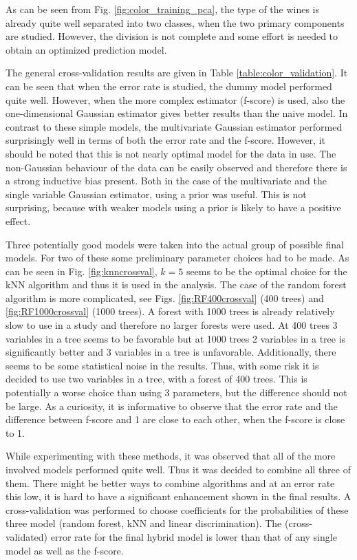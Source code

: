 \documentclass[twoside]{article}
\begin{document}
\begin{multicols}{2}
As can be seen from Fig. \ref{fig:color_training_pca}, the type of the wines is already quite well separated into two 
classes, when the two primary components are studied. However, the division is not complete and some effort is needed
to obtain an optimized prediction model. 

The general cross-validation results are given in Table \ref{table:color_validation}. It can be seen that when the error
rate is studied, the dummy model performed quite well. However, when the more complex estimator (f-score) is used,
also the one-dimensional Gaussian estimator gives better results than the naive model. In contrast to these simple models,
the multivariate Gaussian estimator performed surprisingly well in terms of both the error rate and the f-score.
However, it should be noted that this is not nearly optimal model for the data in use. The non-Gaussian behaviour
of the data can be easily observed and therefore there is a strong inductive bias present. Both in the case of the
multivariate and the single variable Gaussian estimator, using a prior was useful. This is not surprising, because
with weaker models using a prior is likely to have a positive effect.

Three potentially good models were taken into the actual group of possible final models. For two of these some preliminary
parameter choices had to be made. As can be seen in Fig. \ref{fig:knncrossval}, $k = 5$ seems to be the optimal choice
for the kNN algorithm and thus it is used in the analysis. The case of the random forest algorithm is more complicated, see
Figs. \ref{fig:RF400crossval} (400 trees) and \ref{fig:RF1000crossval} (1000 trees).
A forest with 1000 trees is already relatively slow to use in a study and therefore no larger forests were used. At 400
trees 3 variables in a tree seems to be favorable but at 1000 trees 2 variables in a tree is significantly better and 3 variables
in a tree is unfavorable. Additionally, there seems to be some statistical noise in the results. Thus, with some risk it is
decided to use two variables in a tree, with a forest of 400 trees. This is potentially a worse choice than using 3 parameters,
but the difference should not be large. As a curiosity, it is informative to observe that the error rate and the difference between
f-score and 1 are close to each other, when the f-score is close to 1.

While experimenting with these methods, it was observed that all of the more involved models performed quite well. Thus it was
decided to combine all three of them. There might be better ways to combine algorithms and at an error rate this low, it is
hard to have a significant enhancement shown in the final results. A cross-validation was performed to choose coefficients for
the probabilities of these three model (random forest, kNN and linear discrimination). The (cross-validated) error rate for the final hybrid model
is lower than that of any single model as well as the f-score.


\end{multicols}
\end{document}
